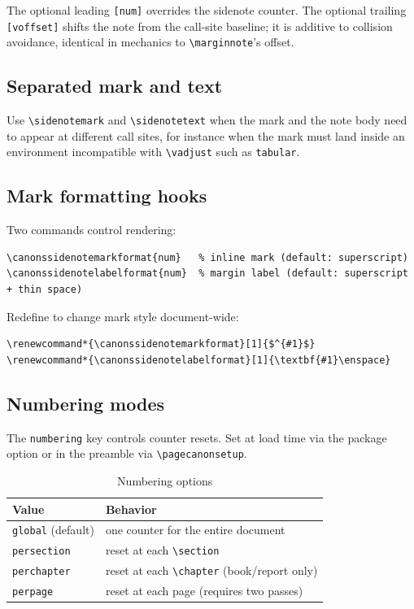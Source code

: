 \documentclass[11pt, twoside, openany]{book}
\newcommand{\cmd}[1]{\texttt{\textbackslash #1}}
\begin{document}
The optional leading \texttt{[num]} overrides the sidenote counter. The optional trailing \texttt{[voffset]} shifts the note from the call-site baseline; it is additive to collision avoidance, identical in mechanics to \cmd{marginnote}'s offset.

\subsection{Separated mark and text}\label{subsec:sidenotesmark}

Use \cmd{sidenotemark} and \cmd{sidenotetext} when the mark and the note body need to appear at different call sites, for instance when the mark must land inside an environment incompatible with \cmd{vadjust} such as \texttt{tabular}.

\subsection{Mark formatting hooks}\label{subsec:sidenotesmarkhooks}

Two commands control rendering:
\begin{verbatim}
\canonssidenotemarkformat{num}   % inline mark (default: superscript)
\canonssidenotelabelformat{num}  % margin label (default: superscript + thin space)
\end{verbatim}

Redefine to change mark style document-wide:
\begin{verbatim}
\renewcommand*{\canonssidenotemarkformat}[1]{$^{#1}$}
\renewcommand*{\canonssidenotelabelformat}[1]{\textbf{#1}\enspace}
\end{verbatim}

\subsection{Numbering modes}\label{subsec:sidenotesnumbering}

The \texttt{numbering} key controls counter resets. Set at load time via the package option or in the preamble via \cmd{pagecanonsetup}.

\begin{table}[h]
	\centering
	\caption{Numbering options}
	\label{tab:numopts}
	\begin{tabular}{ll}
		\textbf{Value}            & \textbf{Behavior}                              \\
		\hline
		\texttt{global} (default) & one counter for the entire document            \\
		\texttt{persection}       & reset at each \cmd{section}                    \\
		\texttt{perchapter}       & reset at each \cmd{chapter} (book/report only) \\
		\texttt{perpage}          & reset at each page (requires two passes)       \\
	\end{tabular}
\end{table}
\end{document}

